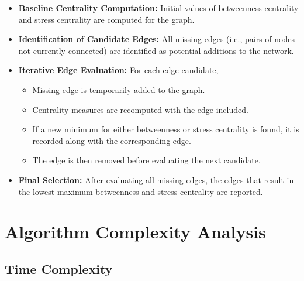 \documentclass[12pt]{article}
\begin{document}
\begin{itemize}

	\item \textbf{Baseline Centrality Computation:}
	      Initial values of betweenness centrality and stress centrality are computed for the graph.

	\item \textbf{Identification of Candidate Edges:}
	      All missing edges (i.e., pairs of nodes not currently connected) are identified as potential additions to the network.

	\item \textbf{Iterative Edge Evaluation:}
	      For each edge candidate,
	      \begin{itemize}
		      \item Missing edge is temporarily added to the graph.
		      \item Centrality measures are recomputed with the edge included.
		      \item If a new minimum for either betweenness or stress centrality is found, it is recorded along with the corresponding edge.
		      \item The edge is then removed before evaluating the next candidate.
	      \end{itemize}

	\item \textbf{Final Selection:}
	      After evaluating all missing edges, the edges that result in the lowest
	      maximum betweenness and stress centrality are reported.
\end{itemize}



\section{Algorithm Complexity Analysis}
\subsection{Time Complexity}
\end{document}
